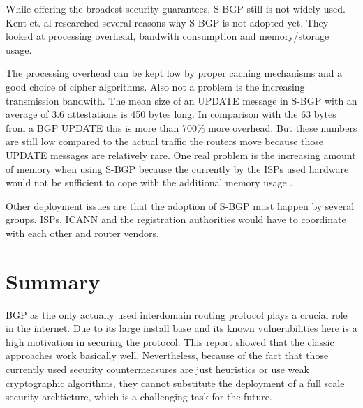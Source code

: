 \documentclass[12pt,a4paper]{IEEEtran}
\begin{document}
		While offering the broadest security guarantees, S-BGP still is not widely used. 
		Kent et. al \citep{Kent2000a}
		researched several reasons why S-BGP is not adopted yet. They looked at processing overhead, bandwith consumption and memory/storage usage. 
		
		The processing overhead can be kept low by proper caching mechanisms and a good choice of cipher algorithms. 
		Also not a problem is the increasing transmission bandwith. The mean size of an UPDATE message in S-BGP with an average of 3.6 attestations is 450 bytes long. In comparison with the 63 bytes from a BGP UPDATE this is more than 700\% more overhead. But these numbers are still low compared to the actual traffic the routers move because those UPDATE messages are relatively rare. 
		One real problem is the increasing amount of memory when using S-BGP because the currently by the ISPs used hardware would not be sufficient to cope with the additional memory usage \citep{Kent2000a}.

		Other deployment issues are that the adoption of S-BGP must happen by several groups. ISPs, ICANN and the registration authorities would have to coordinate with each other and router vendors.
				
		
	\section{Summary}				
	BGP as the only actually used interdomain routing protocol plays a crucial role in the internet. Due to its large install base and its known vulnerabilities here is a high motivation in securing the protocol. This report showed that the classic approaches work basically well. Nevertheless, because of the fact that those currently used security countermeasures are just heuristics or use weak cryptographic algorithms, they cannot substitute the  deployment of a full scale security archticture, which is a challenging task for the future. 
	
	
	
\end{document}
